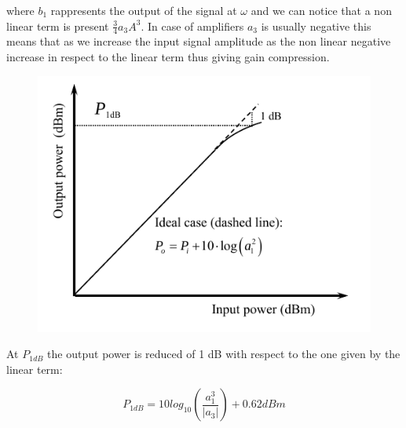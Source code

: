 where $b_1$ rappresents the output of the signal at $\omega$ and we can notice that a non linear term is present $\frac{3}{4}a_3A^3$.
In case of amplifiers $a_3$ is usually negative this means that as we increase the input signal amplitude as the non linear negative increase in respect to the linear term thus giving gain compression.

\begin{figure}[h]
	\centering
	\includegraphics[scale=0.5]{Immagini/1db}
	
	\label{fig:1db}
\end{figure}


At $P_{1dB}$ the output power is reduced of 1 dB with respect to the one given by the linear term:

\begin{equation}
	P_{1dB}= 10log_{10}\left( \frac{a_1^3}{|a_3|} \right)+0.62dBm
\end{equation}




